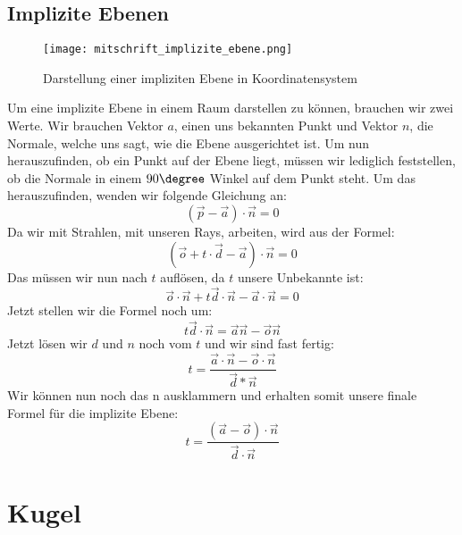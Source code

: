 \documentclass[tog]{acmsiggraph}
\begin{document}
\subsection{Implizite Ebenen}

\begin{figure}[ht]
  \centering
	\texttt{[image: mitschrift\_implizite\_ebene.png]}
	\caption{Darstellung einer impliziten Ebene in Koordinatensystem}
  \label{fig:implicit_plane}
\end{figure}
Um eine implizite Ebene in einem Raum darstellen zu können, brauchen wir zwei Werte. Wir brauchen Vektor $a$, einen uns bekannten Punkt und Vektor $n$, die Normale, welche uns sagt, wie die Ebene ausgerichtet ist. Um nun herauszufinden, ob ein Punkt auf der Ebene liegt, müssen wir lediglich feststellen, ob die Normale in einem $90\degree$ Winkel auf dem Punkt steht. Um das herauszufinden, wenden wir folgende Gleichung an: 
$$(\vec{p} - \vec{a}) \cdot \vec{n} = 0$$ 
Da wir mit Strahlen, mit unseren Rays, arbeiten, wird aus der Formel:
$$(\vec{o}+t\cdot\vec{d}-\vec{a})\cdot\vec{n} = 0$$
Das müssen wir nun nach $t$ auflösen, da $t$ unsere Unbekannte ist:
$$\vec{o}\cdot\vec{n} + t\vec{d}\cdot\vec{n} - \vec{a} \cdot \vec{n} = 0$$
Jetzt stellen wir die Formel noch um:
$$t\vec{d}\cdot\vec{n} = \vec{a}\vec{n} - \vec{o}\vec{n}$$
Jetzt lösen wir $d$ und $n$ noch vom $t$ und wir sind fast fertig:
$$t = \frac{\vec{a}\cdot\vec{n} - \vec{o} \cdot \vec{n}}{\vec{d}*\vec{n}}$$
Wir können nun noch das n ausklammern und erhalten somit unsere finale Formel für die implizite Ebene:
$$t = \frac{(\vec{a}-\vec{o}) \cdot \vec{n}}{\vec{d}\cdot\vec{n}}$$

\section{Kugel}
\end{document}
